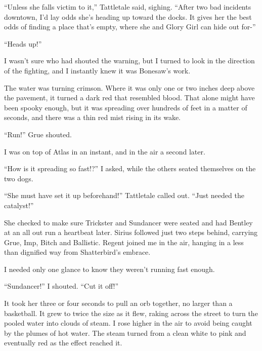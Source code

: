 ``Unless she falls victim to it,'' Tattletale said, sighing.  ``After two bad incidents downtown, I'd lay odds she's heading up toward the docks.  It gives her the best odds of finding a place that's empty, where she and Glory Girl can hide out for-''



``Heads up!''



I wasn't sure who had shouted the warning, but I turned to look in the direction of the fighting, and I instantly knew it was Bonesaw's work.



The water was turning crimson.  Where it was only one or two inches deep above the pavement, it turned a dark red that resembled blood.  That alone might have been spooky enough, but it was spreading over hundreds of feet in a matter of seconds, and there was a thin red mist rising in its wake.



``Run!''  Grue shouted.



I was on top of Atlas in an instant, and in the air a second later.



``How is it spreading so fast!?''  I asked, while the others seated themselves on the two dogs.



``She must have set it up beforehand!''  Tattletale called out.  ``Just needed the catalyst!''



She checked to make sure Trickster and Sundancer were seated and had Bentley at an all out run a heartbeat later.  Sirius followed just two steps behind, carrying Grue, Imp, Bitch and Ballistic.  Regent joined me in the air, hanging in a less than dignified way from Shatterbird's embrace.



I needed only one glance to know they weren't running fast enough.



``Sundancer!''  I shouted.  ``Cut it off!''



It took her three or four seconds to pull an orb together, no larger than a basketball.  It grew to twice the size as it flew, raking across the street to turn the pooled water into clouds of steam.  I rose higher in the air to avoid being caught by the plumes of hot water.  The steam turned from a clean white to pink and eventually red as the effect reached it.




